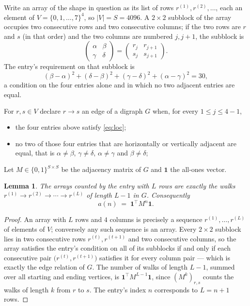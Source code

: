 \documentclass[11pt,a4paper]{article}
\theoremstyle{plain}
\newtheorem{lemma}[theorem]{Lemma}
\theoremstyle{definition}
\begin{document}
Write an array of the shape in question as its list of rows
$r^{(1)},r^{(2)},\dots$, each an element of
$V=\{0,1,\dots,7\}^{4}$, so $|V|=S=4096$. A $2\times2$ subblock of the array
occupies two consecutive rows and two consecutive columns; if the two rows are $r$
and $s$ (in that order) and the two columns are numbered $j,j+1$,
the subblock is
\[
\begin{pmatrix}\alpha&\beta\\\gamma&\delta\end{pmatrix}=\begin{pmatrix}r_j&r_{j+1}\\s_j&s_{j+1}\end{pmatrix}.
\]
The entry's requirement on that subblock is
\begin{equation}\label{eq:loc}
(\beta-\alpha)^2+(\delta-\beta)^2+(\gamma-\delta)^2+(\alpha-\gamma)^2=30,
\end{equation}
a condition on the four entries alone and in which no two adjacent entries are equal.

For $r,s\in V$ declare $r\to s$ an edge of a digraph $G$ when, for every
$1\le j\le 4-1$,
\begin{itemize}
\item the four entries above satisfy \eqref{eq:loc};
\item no two of those four entries that are horizontally or vertically adjacent are equal, that is $\alpha\ne\beta$, $\gamma\ne\delta$, $\alpha\ne\gamma$ and $\beta\ne\delta$;
\end{itemize}
Let $M\in\{0,1\}^{S\times S}$ be the adjacency matrix of $G$ and $\mathbf{1}$ the
all-ones vector.

\begin{lemma}\label{lem:walk}
The arrays counted by the entry with $L$ rows are exactly the walks
$r^{(1)}\to r^{(2)}\to\cdots\to r^{(L)}$ of length $L-1$ in $G$. Consequently
\[
a(n)\;=\;\mathbf{1}^{\!\top}M^{n}\mathbf{1} .
\]
\end{lemma}

\begin{proof}
An array with $L$ rows and $4$ columns is precisely a sequence
$r^{(1)},\dots,r^{(L)}$ of elements of $V$; conversely any such sequence is an array.
Every $2\times2$ subblock lies in two consecutive rows $r^{(t)},r^{(t+1)}$ and two
consecutive columns, so the array satisfies the entry's condition on all of its subblocks
if and only if each consecutive pair $\bigl(r^{(t)},r^{(t+1)}\bigr)$ satisfies it for
every column pair --- which is exactly the edge relation of $G$. The number of walks of
length $L-1$, summed over all starting and ending vertices, is
$\mathbf{1}^{\!\top}M^{L-1}\mathbf{1}$, since $(M^{k})_{r,s}$ counts the walks of
length $k$ from $r$ to $s$. The entry's index $n$ corresponds to $L=n+1$ rows.
\end{proof}
\end{document}
